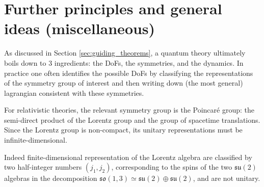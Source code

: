 \documentclass[../QFT_main.tex]{subfiles}
\begin{document}
\section{Further principles and general ideas (miscellaneous)} 


\begin{mytheorem}
As discussed in Section \ref{sec:guiding_theorems}, a quantum theory ultimately boils down to 3 ingredients: the DoFs, the symmetries, and the dynamics.
In practice one often identifies the possible DoFs by classifying the representations of the symmetry group of interest and then writing down (the most general) lagrangian consistent with these symmetries.

For relativistic theories, the relevant symmetry group is the Poincaré group: the semi-direct product of the Lorentz group and the group of spacetime translations.
Since the Lorentz group is non-compact, its unitary representations must be infinite-dimensional.

Indeed finite-dimensional representation of the Lorentz algebra are classified by two half-integer numbers $(j_1,j_2)$, corresponding to the spins of the two $\mathfrak{su}(2)$ algebras in the decomposition $\mathfrak{so}(1,3)\simeq \mathfrak{su}(2)\oplus \mathfrak{su}(2)$, and are not unitary.


\end{mytheorem}
\end{document}
